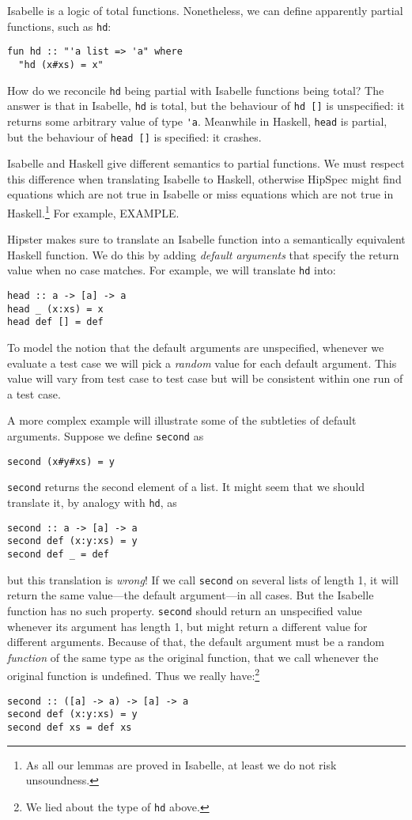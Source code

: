 Isabelle is a logic of total functions. Nonetheless, we can define
apparently partial functions, such as \verb|hd|:
\begin{verbatim}
fun hd :: "'a list => 'a" where
  "hd (x#xs) = x"
\end{verbatim}

How do we reconcile \verb|hd| being partial with Isabelle functions
being total? The answer is that in Isabelle, \verb|hd| is total, but
the behaviour of \verb|hd []| is unspecified: it returns some
arbitrary value of type \verb|'a|. Meanwhile in Haskell, \verb|head|
is partial, but the behaviour of \verb|head []| is specified: it
crashes.

Isabelle and Haskell give different semantics to partial functions. We
must respect this difference when translating Isabelle to Haskell,
otherwise HipSpec might find equations which are not true in Isabelle
or miss equations which are not true in Haskell.\footnote{As all our
lemmas are proved in Isabelle, at least we do not risk unsoundness.}
For example, EXAMPLE.

Hipster makes sure to translate an Isabelle function into a
semantically equivalent Haskell function. We do this by adding
\emph{default arguments} that specify the return value when no case matches.
For example, we will translate \verb|hd| into:
\begin{verbatim}
head :: a -> [a] -> a
head _ (x:xs) = x
head def [] = def
\end{verbatim}
To model the notion that the default arguments are unspecified,
whenever we evaluate a test case we will pick a \emph{random} value
for each default argument. This value will vary from test case to test
case but will be consistent within one run of a test case.

A more complex example will illustrate some of the subtleties of
default arguments. Suppose we define \verb|second| as
\begin{verbatim}
second (x#y#xs) = y
\end{verbatim}
\verb|second| returns the second element of a list. It might seem that
we should translate it, by analogy with \verb|hd|, as
\begin{verbatim}
second :: a -> [a] -> a
second def (x:y:xs) = y
second def _ = def
\end{verbatim}
but this translation is \emph{wrong}! If we call \verb|second| on
several lists of length 1, it will return the same value---the default
argument---in all cases. But the Isabelle function has no such property.
\verb|second| should return an unspecified value whenever its argument
has length 1, but might return a different value for different arguments.
Because of that, the default argument must be a random \emph{function}
of the same type as the original function, that we call whenever the
original function is undefined. Thus we really have:\footnote{We lied
about the type of \texttt{hd} above.}
\begin{verbatim}
second :: ([a] -> a) -> [a] -> a
second def (x:y:xs) = y
second def xs = def xs
\end{verbatim}

